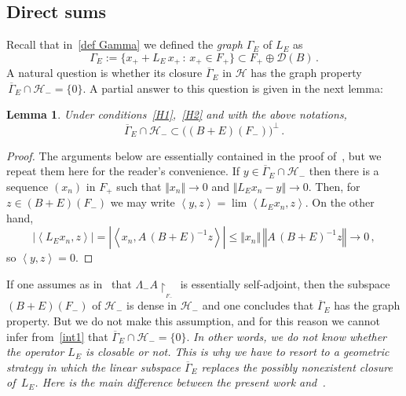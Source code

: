 \documentclass[12pt,reqno]{amsart}
\newtheorem{lemma}[theorem]{Lemma}
\newcommand{\innerproduct}[2]{\left\langle #1, #2 \right\rangle}
\newcommand{\be}[1]{\begin{equation}\label{#1}}
\newcommand{\ee}{\end{equation}}
\renewcommand{\(}{\left(}
\renewcommand{\)}{\right)}
\begin{document}
\subsection{Direct sums}\label{Section: direct sum}

Recall that in~\eqref{def Gamma} we defined the {\it graph} $\Gamma_E$ of $L_E$ as
\[
\Gamma_E:= \big\{x_++L_E\,x_+\,:\, x_+\in F_+\big\}\subset F_+\oplus \mathcal D(B)\,.
\]
A natural question is whether its closure $\overline \Gamma_E$ in $\mathcal H$ has the graph property $\,\overline \Gamma_E\cap \mathcal H_-=\{0\}$. A partial answer to this question is given in the next lemma:
\begin{lemma}\label{Lemma:inclusion} Under conditions~\eqref{H1},~\eqref{H2} and with the above notations,
\be{int1}
\overline \Gamma_E\cap \mathcal H_- \subset \big((B+E)(F_-)\big)^\perp \,.
\ee
\end{lemma}
\begin{proof}
The arguments below are essentially contained in the proof of~\cite[Lemma~2.2]{SST20}, but we repeat them here for the reader's convenience. If $y\in \overline \Gamma_E\cap \mathcal H_-$ then there is a sequence $(x_n)$ in $F_+$ such that $\Vert x_n\Vert\to 0$ and $\Vert L_E x_n-y\Vert\to 0$. Then, for $z\in (B+E)(F_-)$ we may write $\innerproduct{y}{z}=\lim \innerproduct{L_Ex_n}{z}$. On the other hand, \[\vert\innerproduct{L_Ex_n}{z}\vert=\left\vert\innerproduct{x_n}{A\,(B+E)^{-1}z}\right\vert\leq \Vert x_n\Vert\,\left\Vert A\,(B+E)^{-1}z\right\Vert\to 0\,,\]
so $\innerproduct{y}{z}=0$.
\end{proof}
If one assumes as in~\cite{SST20} that $\Lambda_-A\upharpoonright_{_{F_-}}$ is essentially self-adjoint, then the subspace $(B+E)(F_-)$ of $\mathcal H_-$ is dense in $\mathcal H_-$ and one concludes that $\overline \Gamma_E$ has the graph property. But we do not make this assumption, and for this reason we cannot infer from~\eqref{int1} that $\overline \Gamma_E\cap \mathcal H_- =\{0\}$. {\it In other words, we do not know whether the operator $L_E$ is closable or not. This is why we have to resort to a geometric strategy in which the linear subspace $\overline \Gamma_E$ replaces the possibly nonexistent closure of $\,L_E$. Here is the main difference between the present work and~\cite{SST20}.}\medskip
\end{document}
